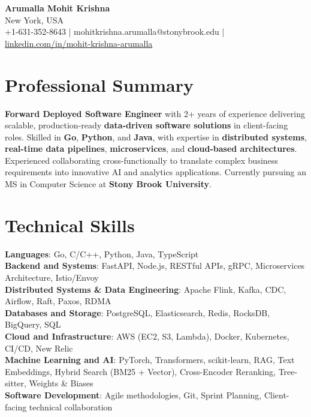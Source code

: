 \documentclass[letterpaper,11pt]{article}
\begin{document}
\begin{center}
  {\Large \textbf{Arumalla Mohit Krishna}} \\
  New York, USA \\
  +1-631-352-8643 \enspace | \enspace mohitkrishna.arumalla@stonybrook.edu \enspace | \enspace \href{https://www.linkedin.com/in/mohit-krishna-arumalla}{linkedin.com/in/mohit-krishna-arumalla}
\end{center}

\section{Professional Summary}
  \begin{itemize}[leftmargin=0.15in, label={}]
    \small{\item{
     \textbf{Forward Deployed Software Engineer} with 2+ years of experience delivering scalable, production-ready \textbf{data-driven software solutions} in client-facing roles. Skilled in \textbf{Go}, \textbf{Python}, and \textbf{Java}, with expertise in \textbf{distributed systems}, \textbf{real-time data pipelines}, \textbf{microservices}, and \textbf{cloud-based architectures}. Experienced collaborating cross-functionally to translate complex business requirements into innovative AI and analytics applications. Currently pursuing an MS in Computer Science at \textbf{Stony Brook University}.
    }}
  \end{itemize}
\vspace{-16pt}

\section{Technical Skills}
 \begin{itemize}[leftmargin=0.15in, label={}]
    \small{\item{
     \textbf{Languages}: Go, C/C++, Python, Java, TypeScript \\
     \textbf{Backend and Systems}: FastAPI, Node.js, RESTful APIs, gRPC, Microservices Architecture, Istio/Envoy \\
     \textbf{Distributed Systems \& Data Engineering}: Apache Flink, Kafka, CDC, Airflow, Raft, Paxos, RDMA \\
     \textbf{Databases and Storage}: PostgreSQL, Elasticsearch, Redis, RocksDB, BigQuery, SQL \\
     \textbf{Cloud and Infrastructure}: AWS (EC2, S3, Lambda), Docker, Kubernetes, CI/CD, New Relic \\
     \textbf{Machine Learning and AI}: PyTorch, Transformers, scikit-learn, RAG, Text Embeddings, Hybrid Search (BM25 + Vector), Cross-Encoder Reranking, Tree-sitter, Weights \& Biases \\
     \textbf{Software Development}: Agile methodologies, Git, Sprint Planning, Client-facing technical collaboration
    }}
 \end{itemize}
\vspace{-16pt}
\end{document}
